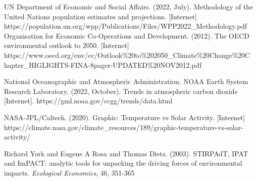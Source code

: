 \documentclass[12pt]{article}
\begin{document}
\begin{thebibliography}{99}
     UN Department of Economic and Social Affairs. (2022, July). Methodology of the United Nations population estimates and projections. [Internet] https://population.un.org/wpp/Publications/Files/WPP2022\_Methodology.pdf
     Organisation for Economic Co-Operations and Development. (2012). The OECD environmental outlook to 2050. [Internet]
    https://www.oecd.org/env/cc/Outlook\%20to\%202050\_Climate\%20Change\%20Chapter\_HIGLIGHTS-FINA-8pager-UPDATED\%20NOV2012.pdf

     National Oceanographic and Atmospheric Administration. NOAA Earth System Research Laboratory. (2022, October). Trends in atmospheric carbon dioxide [Internet]. https://gml.noaa.gov/ccgg/trends/data.html

     NASA-JPL/Caltech. (2020). Graphic: Temperature vs Solar Activity. [Internet] https://climate.nasa.gov/climate\_resources/189/graphic-temperature-vs-solar-activity/

     Richard York and Eugene A Rosa and Thomas Dietz. (2003). STIRPAdT, IPAT and ImPACT: analytic tools for unpacking the driving forces of environmental impacts. \textit{Ecological Economics}, 46, 351-365
\end{thebibliography}
\end{document}

